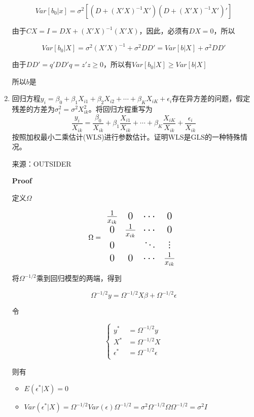 \documentclass{article}
\begin{document}
\begin{enumerate}
    $$
    Var[b_0|x] = \sigma^2[(D+(X'X)^{-1}X')(D+(X'X)^{-1}X')']
    $$
    
    由于$CX=I=DX+(X'X)^{-1}(X'X)$，因此，必须有$DX=0$，所以
    
    $$
    Var[b_0|X] = \sigma^2(X'X)^{-1}+\sigma^2DD'=Var[b|X]+\sigma^2DD'
    $$
    
    由于$DD'=q'DD'q=z'z\ge 0$，所以有$Var[b_0|X] \ge Var[b|X]$
    
    所以$b$是

    \item 回归方程$y_i=\beta_0+\beta_1X_{i1}+\beta_2X_{i2}+\cdots+\beta_KX_{iK}+\epsilon_i$存在异方差的问题，假定残差的方差为$\sigma_i^2=\sigma^2X_{ik}^2$。将回归方程重写为
    $$
      \frac{y_i}{X_{ik}}=\frac{\beta_0}{X_{ik}}+\beta_1\frac{X_{i1}}{X_{ik}}+\cdots+\beta_K\frac{X_{iK}}{X_{ik}}+\frac{\epsilon_i}{X_{ik}}
    $$
    按照加权最小二乘估计(WLS)进行参数估计。证明WLS是GLS的一种特殊情况。
    
    来源：OUTSIDER
    
    \textbf{Proof}
    
    定义$\Omega$
    
    $$\Large\Omega=
    \Large\begin{array}{cccc}
      \frac{1}{x_{ik}} & 0 & \cdots & 0 \\
      0 & \frac{1}{x_{ik}} & \cdots & 0 \\
      0 &   & \ddots & \vdots \\
      0 & 0 & \cdots & \frac{1}{x_{ik}} \\
    \end{array}
    $$
    
    将$\Omega^{-1/2}$乘到回归模型的两端，得到
    
    $$
    \Omega^{-1/2}y=\Omega^{-1/2}X\beta+\Omega^{-1/2}\epsilon
    $$
    
    令
    
    $$
    \left\{
      \begin{aligned}
        y^* &= \Omega^{-1/2}y \\
        X^* &= \Omega^{-1/2}X \\
        \epsilon^* &= \Omega^{-1/2}\epsilon \\
      \end{aligned}
    \right.
    $$
    
    则有
    
    \begin{itemize}
      \item $E(\epsilon^*|X)=0$
      \item $Var(\epsilon^*|X) = \Omega^{-1/2}Var(\epsilon)\Omega^{-1/2}=\sigma^2\Omega^{-1/2}\Omega\Omega^{-1/2}=\sigma^2I$
    \end{itemize}
    

\end{enumerate}
\end{document}
